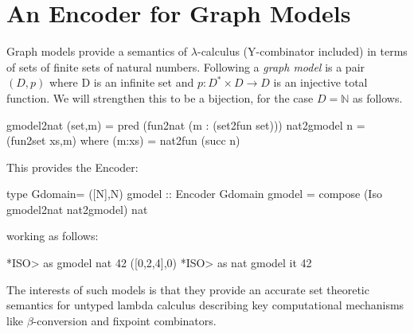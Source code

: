 \documentclass[]{INCLUDES/llncs}
\begin{document}
\section{An Encoder for Graph Models}
Graph models \cite{bucciarelli,berline} provide a semantics of
$\lambda$-calculus (Y-combinator included) in terms of sets of finite sets of natural numbers.
Following \cite{bucciarelli}  a {\em graph model} is a
pair $(D,p)$ where D is an infinite set and $p:D^{*}\times D \rightarrow D$ is
an injective total function. We will strengthen this to be a bijection, for the
case $D=\mathbb{N}$ as follows.
\begin{code}
gmodel2nat (set,m) = pred (fun2nat (m : (set2fun set)))
nat2gmodel n = (fun2set xs,m) where (m:xs) = nat2fun (succ n)
\end{code}
This provides the Encoder:
\begin{code}
type Gdomain= ([N],N)
gmodel :: Encoder Gdomain
gmodel = compose (Iso gmodel2nat nat2gmodel) nat
\end{code}
working as follows:
\begin{codex}
*ISO> as gmodel nat 42
([0,2,4],0)
*ISO> as nat gmodel it
42
\end{codex}
The interests of such models is that they provide an accurate
set theoretic semantics for untyped lambda calculus describing
key computational mechanisms like $\beta$-conversion and fixpoint
combinators.
\end{document}
